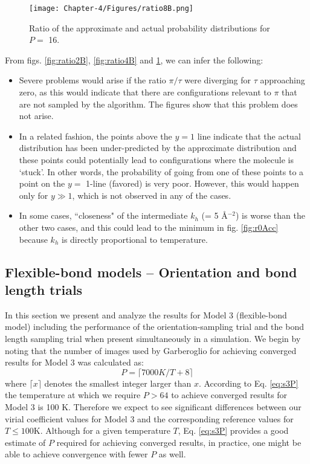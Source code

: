                 \begin{figure}[!htbp]
                    \centering
                    \texttt{[image: Chapter-4/Figures/ratio8B.png]}
                    \caption{Ratio of the approximate and actual probability distributions for $P =$ 16.}
                    \label{fig:ratio8B}
                \end{figure}

                From figs. \ref{fig:ratio2B}, \ref{fig:ratio4B} and \ref{fig:ratio8B}, we can infer the following:
                \begin{itemize}
                \item Severe problems would arise if the ratio $\pi/\tau$ were diverging for $\tau$ approaching zero, as this would indicate that there are configurations relevant to $\pi$ that are not sampled by the algorithm. The figures show that this problem does not arise.
                    \item In a related fashion, the points above the $y =1$ line indicate  that the actual distribution has been under-predicted by the approximate distribution and these points could potentially lead to configurations where the molecule is `stuck'. In other words, the probability of going from one of these points to a point on the $y =$ 1-line (favored) is very poor. However, this would happen only for $y \gg 1$, which is not observed in any of the cases.
                    \item In some cases, ``closeness" of the intermediate $k_h$ (= 5 \AA$^{-2}$) is worse than the other two cases, and this could lead to the minimum in fig. \ref{fig:r0Acc} because $k_h$ is directly proportional to temperature.
                \end{itemize}

        \subsection{Flexible-bond models -- Orientation and bond length trials}
            In this section we present and analyze the results for Model 3 (flexible-bond model) including the performance of the orientation-sampling trial and the bond length sampling trial when present simultaneously in a simulation. We begin by noting that the number of images used by Garberoglio for achieving converged results \cite{Garberoglio2014} for Model 3 was calculated as:
            \begin{equation}
            \label{eq:s3P}
                P = \lceil 7000 K/T + 8 \rceil
            \end{equation}
            where $\lceil x \rceil$ denotes the smallest integer larger than $x$.
According to Eq. \eqref{eq:s3P} the temperature at which we require $P > 64$ to achieve converged results for Model 3 is 100 K. Therefore we expect to see significant differences between our virial coefficient values for Model 3 and the corresponding reference values for $T \le 100 $K. Although for a given temperature $T$, Eq. \eqref{eq:s3P} provides a good estimate of $P$ required for achieving converged results, in practice, one might be able to achieve convergence with fewer $P$ as well.

